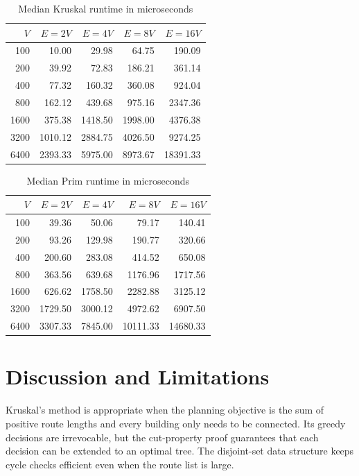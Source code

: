 \documentclass[conference]{IEEEtran}
\begin{document}
\begin{table}[t]
\centering
\caption{Median Kruskal runtime in microseconds}
\label{tab:kruskal-times}
\scriptsize
\begin{tabular}{@{}rrrrr@{}}
\toprule
$V$ & $E=2V$ & $E=4V$ & $E=8V$ & $E=16V$ \\
\midrule
100  & 10.00 & 29.98 & 64.75 & 190.09 \\
200  & 39.92 & 72.83 & 186.21 & 361.14 \\
400  & 77.32 & 160.32 & 360.08 & 924.04 \\
800  & 162.12 & 439.68 & 975.16 & 2347.36 \\
1600 & 375.38 & 1418.50 & 1998.00 & 4376.38 \\
3200 & 1010.12 & 2884.75 & 4026.50 & 9274.25 \\
6400 & 2393.33 & 5975.00 & 8973.67 & 18391.33 \\
\bottomrule
\end{tabular}
\end{table}

\begin{table}[t]
\centering
\caption{Median Prim runtime in microseconds}
\label{tab:prim-times}
\scriptsize
\begin{tabular}{@{}rrrrr@{}}
\toprule
$V$ & $E=2V$ & $E=4V$ & $E=8V$ & $E=16V$ \\
\midrule
100  & 39.36 & 50.06 & 79.17 & 140.41 \\
200  & 93.26 & 129.98 & 190.77 & 320.66 \\
400  & 200.60 & 283.08 & 414.52 & 650.08 \\
800  & 363.56 & 639.68 & 1176.96 & 1717.56 \\
1600 & 626.62 & 1758.50 & 2282.88 & 3125.12 \\
3200 & 1729.50 & 3000.12 & 4972.62 & 6907.50 \\
6400 & 3307.33 & 7845.00 & 10111.33 & 14680.33 \\
\bottomrule
\end{tabular}
\end{table}

\section{Discussion and Limitations}

Kruskal's method is appropriate when the planning objective is the sum of
positive route lengths and every building only needs to be connected. Its
greedy decisions are irrevocable, but the cut-property proof guarantees that
each decision can be extended to an optimal tree. The disjoint-set data
structure keeps cycle checks efficient even when the route list is large.
\end{document}
